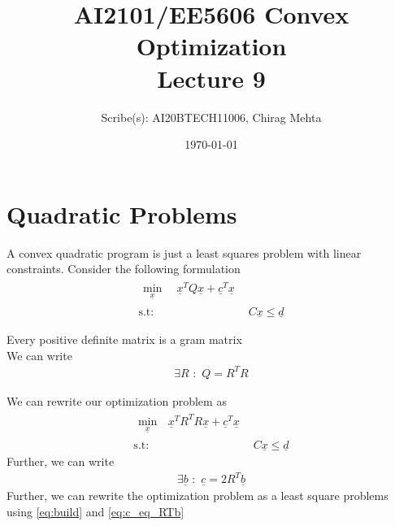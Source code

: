 \documentclass{tufte-handout}
\title[Lecture 9]{\large AI2101/EE5606 Convex Optimization \\ \LARGE Lecture 9}
\author[Chirag Mehta]{Scribe(s): AI20BTECH11006, Chirag Mehta}
\date{\today}  %
\theoremstyle{remark}
\renewcommand{\vec}[1]{\underline{#1}}
\newcommand\twospace{\,\,}
\begin{document}
\maketitle
{}



\section{Quadratic Problems}
A convex quadratic program is just a least squares problem with linear constraints. Consider the following formulation
\begin{align}
    \begin{split}
        \min_{\vec{x}}\, &\twospace\vec{x}^TQ\vec{x} + \vec{c}^T\vec{x}
    \end{split}\\ 
    \text{s.t:}
    \twospace & C\vec{x} \leq \vec{d}
\end{align}

 Every positive definite matrix is a gram matrix\\
We can write
\begin{align}
    \exists R \twospace : \twospace Q = R^TR
\end{align}

We can rewrite our optimization problem as
\begin{align}
    \begin{split}
        \min_{\vec{x}}\, &\vec{x}^TR^TR\vec{x} + \vec{c}^T\vec{x}
    \end{split} \label{eq:build}\\ 
    \text{s.t:}
    \twospace & C\vec{x} \leq \vec{d}
\end{align}
Further, we can write
\begin{align}\exists \vec{b}\twospace : \twospace \vec{c} = 2R^T\vec{b} \label{eq:c_eq_RTb}\end{align}
 Further, we can rewrite the optimization problem as a least square problems using \eqref{eq:build} and \eqref{eq:c_eq_RTb}
\end{document}
